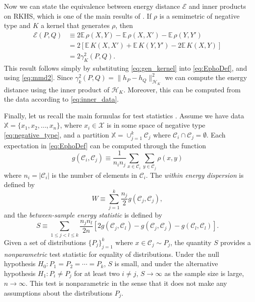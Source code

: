 \documentclass{article}
\newcommand\Energy{\mathcal{E}}
\newcommand\E{\mathbb{E}}
\newcommand\kk{K}
\newcommand\kkk{h}
\newcommand\Hk{{\mathcal{H}}_{\kk}}
\newcommand\C{{\mathcal{C}}}
\begin{document}
Now we can state the equivalence between energy distance $\Energy$ and
inner products on RKHS, which is one of the main results of
\cite{Sejdinovic2013}. If $\rho$ is a semimetric
of negative type and $\kk$ a kernel that generates $\rho$, then
\begin{align}
\Energy(P, Q) &\equiv 2\E \, \rho(X,Y) - \E \, \rho(X,X') - \E \, \rho(Y,Y') 
\label{eq:EphoDef}\\
&= 2 \left[ \E \, \kk(X, X') + \E \, \kk(Y, Y') - 2\E \, \kk(X, Y)\right] \\
&=2 \gamma_\kk^2(P,Q) .
\end{align}
This result follows simply by substituting \eqref{eq:gen_kernel} into
\eqref{eq:EphoDef}, and using \eqref{eq:mmd2}.
Since $\gamma_k^2(P, Q) = \| \kkk_P - \kkk_Q \|^2_{\Hk}$ we
can compute the energy distance using the inner product of $\Hk$. Moreover,
this can be computed from the data according to \eqref{eq:inner_data}.

Finally, let us recall the main formulas for test statistics
\cite{Szkely2013}. 
Assume we have data $\mathbb{X} = \{ x_1,x_2,\dotsc, x_n \}$, where
$x_i \in \mathcal{X}$ is in some space of 
negative type \eqref{eq:negative_type},
and a partition $\mathbb{X} = \cup_{j=1}^k \C_j$ where
$\C_i \cap \C_j = \emptyset$.
Each expectation in 
\eqref{eq:EphoDef}
can be computed 
through the function
\begin{equation}
\label{eq:g_def}
g (\C_i, \C_j) \equiv 
\dfrac{1}{n_i n_j}
\sum_{x \in \C_i} 
\sum_{y \in \C_j} \rho(x, y)
\end{equation}
where $n_i = |\C_i|$ is the number of elements in 
$\C_i$. 
The \emph{within energy dispersion} is defined by
\begin{equation}
\label{eq:within}
W \equiv
\sum_{j=1}^{k} \dfrac{n_j}{2} g(\C_j, \C_j),
\end{equation}
and the \emph{between-sample energy statistic} is defined by
\begin{equation}
\label{eq:between}
S \equiv
\sum_{1 \le  j < l \le k } \dfrac{n_j n_{l}}{2 n} \left[
2 g(\C_j, \C_l) - 
g(\C_j, \C_j) - 
g(\C_l, \C_l)
\right].
\end{equation}
Given a set of distributions
$\{ P_j\}_{j=1}^k$ where $x \in \C_j \sim P_j$, the quantity
$S$ provides
a \emph{nonparametric} test statistic for equality of distributions.
Under the null hypothesis $H_0: P_1=P_2=\dotsm=P_k$, $S$ is small, 
and under
the alternative hypothesis $H_1: P_i \ne P_j$ for at least two $i\ne j$, 
$S \to \infty$ as the sample size is large, $n \to \infty$.
This test is nonparametric in the sense that it does not make any assumptions
about the distributions $P_j$.
\end{document}
